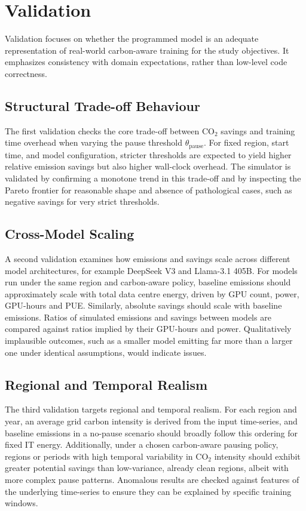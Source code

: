 \section{Validation}

Validation focuses on whether the programmed model is an adequate
representation of real-world carbon-aware training for the study objectives.
It emphasizes consistency with domain
expectations, rather than low-level code correctness.

\subsection{Structural Trade-off Behaviour}

The first validation checks the core trade-off between CO$_2$ savings and
training time overhead when varying the pause threshold
$\theta_{\text{pause}}$. For fixed region, start time, and model
configuration, stricter thresholds are expected to yield higher relative
emission savings but also higher wall-clock overhead. The simulator is
validated by confirming a monotone trend in this trade-off and by inspecting
the Pareto frontier for reasonable shape and absence of pathological cases,
such as negative savings for very strict thresholds.

\subsection{Cross-Model Scaling}

A second validation examines how emissions and savings scale across different
model architectures, for example DeepSeek V3 and Llama-3.1 405B. For models
run under the same region and carbon-aware policy, baseline emissions should
approximately scale with total data centre energy, driven by GPU count, power,
GPU-hours and PUE. Similarly, absolute savings should scale with baseline
emissions. Ratios of simulated emissions and savings between models are
compared against ratios implied by their GPU-hours and power. Qualitatively
implausible outcomes, such as a smaller model emitting far more than a larger
one under identical assumptions, would indicate issues.

\subsection{Regional and Temporal Realism}

The third validation targets regional and temporal realism. For each region
and year, an average grid carbon intensity is derived from the input
time-series, and baseline emissions in a no-pause scenario should broadly
follow this ordering for fixed IT energy. Additionally, under a chosen
carbon-aware pausing policy, regions or periods with high temporal variability
in CO$_2$ intensity should exhibit greater potential savings than low-variance,
already clean regions, albeit with more complex pause patterns. Anomalous
results are checked against features of the underlying time-series to ensure
they can be explained by specific training windows.


